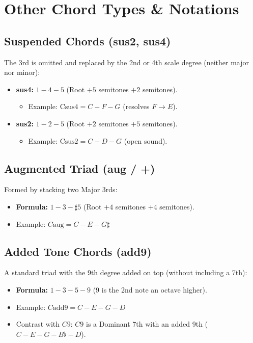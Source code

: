 \section{Other Chord Types \& Notations}

\subsection{Suspended Chords (sus2, sus4)}

The 3rd is omitted and replaced by the 2nd or 4th scale degree (neither major nor minor):
\begin{itemize}
    \item \textbf{sus4:} $1 - 4 - 5$ (Root $+ 5$ semitones $+ 2$ semitones).
    \begin{itemize}
        \item Example: $\text{Csus4} = C - F - G$ (resolves $F \rightarrow E$).
    \end{itemize}
    \item \textbf{sus2:} $1 - 2 - 5$ (Root $+ 2$ semitones $+ 5$ semitones).
    \begin{itemize}
        \item Example: $\text{Csus2} = C - D - G$ (open sound).
    \end{itemize}
\end{itemize}

\subsection{Augmented Triad (aug / +)}

Formed by stacking two Major 3rds:
\begin{itemize}
    \item \textbf{Formula:} $1 - 3 - \sharp 5$ (Root $+ 4$ semitones $+ 4$ semitones).
    \item Example: $C\text{aug} = C - E - G\sharp$
\end{itemize}

\subsection{Added Tone Chords (add9)}

A standard triad with the 9th degree added on top (without including a 7th):
\begin{itemize}
    \item \textbf{Formula:} $1 - 3 - 5 - 9$ (9 is the 2nd note an octave higher).
    \item Example: $C\text{add}9 = C - E - G - D$
    \item Contrast with $C9$: $C9$ is a Dominant 7th with an added 9th ($C - E - G - B\flat - D$).
\end{itemize}

